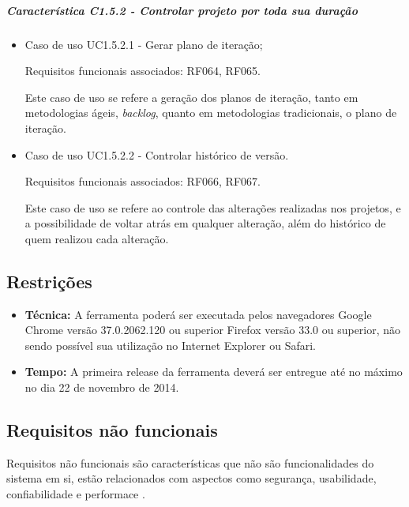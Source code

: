 	\subparagraph{Característica C1.5.2 - Controlar projeto por toda sua duração}
		\begin{itemize}
			
			\item Caso de uso UC1.5.2.1 - Gerar plano de iteração;
					
					Requisitos funcionais associados: RF064, RF065.
					
					Este caso de uso se refere a geração dos planos de iteração, tanto em metodologias ágeis, \textit{backlog}, quanto em metodologias tradicionais, o plano de iteração.

			\item Caso de uso UC1.5.2.2 - Controlar histórico de versão.
				
				Requisitos funcionais associados: RF066, RF067.

				Este caso de uso se refere ao controle das alterações realizadas nos projetos, e a possibilidade de voltar atrás em qualquer alteração, além do histórico de quem realizou cada alteração.

		\end{itemize}

\subsection{Restrições}

\begin{itemize}
	\item \textbf{Técnica:}
		A ferramenta poderá ser executada pelos navegadores Google Chrome versão 37.0.2062.120 ou superior Firefox versão 33.0 ou superior, não sendo possível sua utilização no Internet Explorer ou Safari.
	\item \textbf{Tempo:}
		A primeira release da ferramenta deverá ser entregue até no máximo no dia 22 de novembro de 2014.
\end{itemize}

\subsection{Requisitos não funcionais}

Requisitos não funcionais são características que não são funcionalidades do sistema em si, estão relacionados com aspectos como segurança, usabilidade, confiabilidade e performace \cite{derequisitos}.

